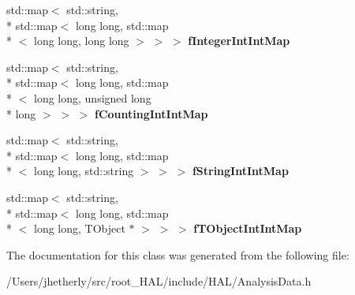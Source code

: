 \begin{DoxyCompactItemize}
\item 
\hypertarget{class_h_a_l_1_1_analysis_data_aceaf51773c7764689b4f708fc5d14987}{std\-::map$<$ std\-::string, \\*
std\-::map$<$ long long, std\-::map\\*
$<$ long long, long long $>$ $>$ $>$ {\bfseries f\-Integer\-Int\-Int\-Map}}\label{class_h_a_l_1_1_analysis_data_aceaf51773c7764689b4f708fc5d14987}

\item 
\hypertarget{class_h_a_l_1_1_analysis_data_a9c5299ababe77a21e115ea7cf3f75170}{std\-::map$<$ std\-::string, \\*
std\-::map$<$ long long, std\-::map\\*
$<$ long long, unsigned long \\*
long $>$ $>$ $>$ {\bfseries f\-Counting\-Int\-Int\-Map}}\label{class_h_a_l_1_1_analysis_data_a9c5299ababe77a21e115ea7cf3f75170}

\item 
\hypertarget{class_h_a_l_1_1_analysis_data_aece38bfde45c0764e68bc0d09c2c651d}{std\-::map$<$ std\-::string, \\*
std\-::map$<$ long long, std\-::map\\*
$<$ long long, std\-::string $>$ $>$ $>$ {\bfseries f\-String\-Int\-Int\-Map}}\label{class_h_a_l_1_1_analysis_data_aece38bfde45c0764e68bc0d09c2c651d}

\item 
\hypertarget{class_h_a_l_1_1_analysis_data_a5b2915a3b29ce7479d2fa68f019fc9fb}{std\-::map$<$ std\-::string, \\*
std\-::map$<$ long long, std\-::map\\*
$<$ long long, T\-Object $\ast$ $>$ $>$ $>$ {\bfseries f\-T\-Object\-Int\-Int\-Map}}\label{class_h_a_l_1_1_analysis_data_a5b2915a3b29ce7479d2fa68f019fc9fb}

\end{DoxyCompactItemize}


The documentation for this class was generated from the following file\-:\begin{DoxyCompactItemize}
\item 
/\-Users/jhetherly/src/root\-\_\-\-H\-A\-L/include/\-H\-A\-L/Analysis\-Data.\-h\end{DoxyCompactItemize}
